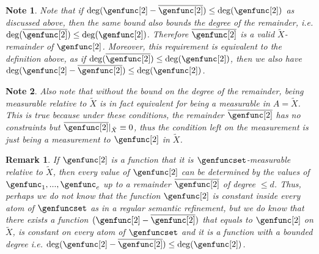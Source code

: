 \documentclass[10pt,a4paper]{article}
\newtheorem{remark}[theorem]{Remark}
\newtheorem*{note*}{Note}
\newcommand{\degree}[0]{d}
\newcommand{\restrictfunc}[2]{#1|_{#2}}
\newcommand{\relativeremainder}[1]{\overline{#1}}
\newcommand{\variety}{{\tilde{X}}}
\begin{document}
\begin{note*}
    Note that if $\deg(\genfunc[2] - \relativeremainder{\genfunc[2]}) \leq \deg(\genfunc[2])$ as discussed above,
    then the same bound  also bounds the degree of the remainder, i.e. $\deg(\relativeremainder{\genfunc[2]}) \leq \deg(\genfunc[2])$.
    Therefore $\relativeremainder{\genfunc[2]}$ is a valid $\variety$-remainder of $\genfunc[2]$.
    Moreover, this requirement is equivalent to the definition above,
    as if $\deg(\relativeremainder{\genfunc[2]}) \leq \deg(\genfunc[2])$, then we also have $\deg(\genfunc[2] - \relativeremainder{\genfunc[2]}) \leq \deg(\genfunc[2])$.
\end{note*}
\begin{note*}
    Also note that without the bound on the degree of the remainder,
    being measurable relative to $\variety$ is in fact equivalent for being a measurable in $A = \variety$.
    This is true because under these conditions, the remainder $\relativeremainder{\genfunc[2]}$ has no constraints but $\restrictfunc{\relativeremainder{\genfunc[2]}}{\variety} \equiv 0$,
    thus the condition left on the measurement is just being a measurement to $\genfunc[2]$ in $\variety$.
\end{note*}
\begin{remark}
    If $\genfunc[2]$ is a function that it is $\genfuncset$-measurable relative to $\variety$,
    then every value of $\genfunc[2]$ can be determined by the values of $\genfunc_1,...,\genfunc_c$ up to a remainder $\relativeremainder{\genfunc[2]}$ of degree $\leq \degree$.
    Thus, perhaps we do not know that the function $\genfunc[2]$ is constant inside every atom of $\genfuncset$ as in a regular semantic refinement,
    but we do know that there exists a function $(\genfunc[2] - \relativeremainder{\genfunc[2]})$ that equals to $\genfunc[2]$ on $\variety$, is constant on every atom of $\genfuncset$ and it is a function with a bounded degree i.e. $\deg(\genfunc[2] - \relativeremainder{\genfunc[2]})\leq \deg(\genfunc[2])$.
\end{remark}
\end{document}
